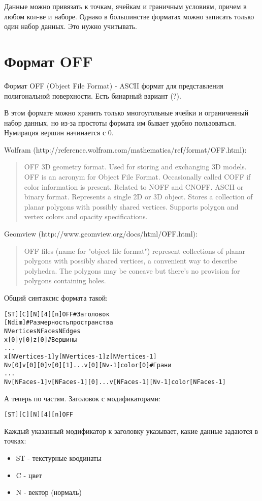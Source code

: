 \documentclass[a4paper,12pt]{article}
\begin{document}
Данные можно привязать к точкам, ячейкам и граничным условиям, причем в любом кол-ве и наборе. Однако в большинстве форматах можно записать только один набор данных. Это нужно учитывать.

\clearpage
\section{Формат OFF}

Формат OFF (Object File Format) - ASCII формат для представления полигональной поверхности. Есть бинарный вариант (?).

В этом формате можно хранить только многоугольные ячейки и ограниченный набор данных, но из-за простоты формата им бывает удобно пользоваться. Нумирация вершин начинается с 0.

Wolfram (http://reference.wolfram.com/mathematica/ref/format/OFF.html):
\begin{quote}
OFF 3D geometry format.
Used for storing and exchanging 3D models.
OFF is an acronym for Object File Format.
Occasionally called COFF if color information is present.
Related to NOFF and CNOFF.
ASCII or binary format.
Represents a single 2D or 3D object.
Stores a collection of planar polygons with possibly shared vertices.
Supports polygon and vertex colors and opacity specifications.
\end{quote}

Geomview (http://www.geomview.org/docs/html/OFF.html):
\begin{quote}
OFF files (name for "object file format") represent collections of planar polygons with possibly shared vertices, a convenient way to describe polyhedra. The polygons may be concave but there's no provision for polygons containing holes. 
\end{quote}

Общий синтаксис формата такой:

\begin{alltt}
[ST][C][N][4][n]OFF	# Заголовок
[Ndim]		# Размерность пространства
NVertices  NFaces  NEdges
x[0]  y[0]  z[0]	# Вершины
...
x[NVertices-1]  y[NVertices-1]  z[NVertices-1]
Nv[0]  v[0][0] v[0][1] ... v[0][Nv-1]  color[0] # Грани
...
Nv[NFaces-1]  v[NFaces-1][0] ... v[NFaces-1][Nv-1]  color[NFaces-1]
\end{alltt}

А теперь по частям. Заголовок с модификаторами:
\begin{alltt}
[ST][C][N][4][n]OFF
\end{alltt}
Каждый указанный модификатор к заголовку указывает, какие данные задаются в точках:
\begin{itemize}
\item ST - текстурные коодинаты
\item C - цвет
\item N - вектор (нормаль)
\end{itemize}
\end{document}
